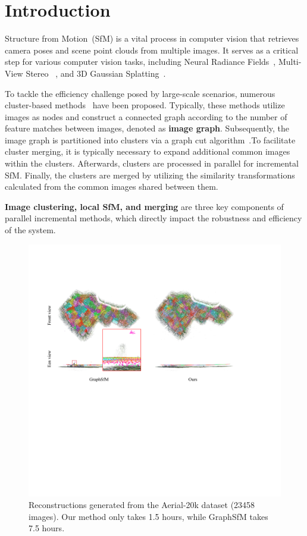 \documentclass[runningheads]{llncs}
\begin{document}
\section{Introduction}

Structure from Motion~(SfM) is a vital process in computer vision that retrieves camera poses and scene point clouds from multiple images. It serves as a critical step for various computer vision tasks, including Neural Radiance Fields~\cite{Cnerf}, Multi-View Stereo ~\cite{RayMVSNet,RayMVSNet++}, and 3D Gaussian Splatting~\cite{3DGS}.

To tackle the efficiency challenge posed by large-scale scenarios, numerous cluster-based methods~\cite{AccPara,AdaSfM,Divide_conquer,TC-SfM,gsfm,large_averaging,merge} have been proposed. Typically, these methods utilize images as nodes and construct a connected graph according to the number of feature matches between images, denoted as \textbf{image graph}. Subsequently, the image graph is partitioned into clusters via a graph cut algorithm~\cite{NCUT}.To facilitate cluster merging, it is typically necessary to expand additional common images within the clusters. Afterwards, clusters are processed in parallel for incremental SfM. Finally, the clusters are merged by utilizing the similarity transformations calculated from the common images shared between them.

\textbf{Image clustering, local SfM, and merging} are three key components of parallel incremental methods, which directly impact the robustness and efficiency of the system. 

\begin{figure}[t]
\centerline{\includegraphics[width=1\textwidth]{figs/compare_20K.pdf}}
	\caption{ Reconstructions generated from the Aerial-20k dataset (23458 images). Our method only takes 1.5 hours, while GraphSfM takes 7.5 hours.}
	\label{Aerial-20k}
\end{figure}
\end{document}

